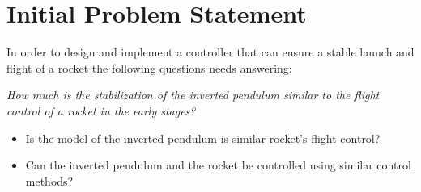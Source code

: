 \chapter{Initial Problem Statement}
In order to design and implement a controller that can ensure a stable launch and flight of a rocket the following questions needs answering: 

\textit{How much is the stabilization of the inverted pendulum similar to the flight control of a rocket in the early stages?}
\bigbreak
\begin{itemize}[noitemsep]
\item Is the model of the inverted pendulum is similar rocket's flight control?
\item Can the inverted pendulum and the rocket be controlled using similar control methods?
\end{itemize}


